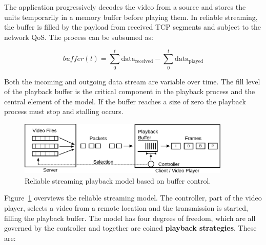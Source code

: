 The application progressively decodes the video from a source and stores the units temporarily in a memory buffer before playing them. In reliable streaming, the buffer is filled by the payload from received \gls{TCP} segments and subject to the network \gls{QoS}. The process can be subsumed as:

\begin{equation*}
	\mathit{buffer}(t) = \sum_{0}^{t} \text{data}_\mathrm{received} - \sum_{0}^{t} \text{data}_\mathrm{played}
\end{equation*}

Both the incoming and outgoing data stream are variable over time. The fill level of the playback buffer is the critical component in the playback process and the central element of the model. If the buffer reaches a size of zero the playback process must stop and stalling occurs.

\begin{figure}[htb]
	\centering
	\includegraphics[width=0.9\textwidth]{images/playback-model.pdf}
	\caption{Reliable streaming playback model based on buffer control.}
\label{c3:fig:playback-model}
\end{figure}

Figure~\ref{c3:fig:playback-model} overviews the reliable streaming model. The controller, part of the video player, selects a video from a remote location and the transmission is started, filling the playback buffer. The model has four degrees of freedom, which are all governed by the controller and together are coined \textbf{playback strategies}. These are:

